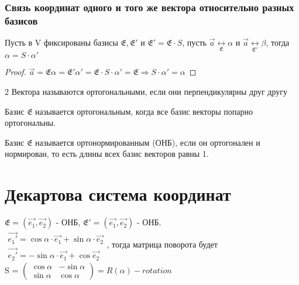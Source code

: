 \subsubsection{Связь координат одного и того же вектора относительно разных базисов}
\begin{proposition}
	Пусть в V фиксированы базисы $\mathfrak{E}, \mathfrak{E'}$ и \(\mathfrak{E'} = \mathfrak{E}\cdot S\), пусть $\vec{a}\underset{\mathfrak{E}}{\longleftrightarrow}\alpha$ и 
	$\vec{a}\underset{\mathfrak{E'}}{\longleftrightarrow}\beta$, тогда \(\alpha = S\cdot \alpha'\)
\end{proposition}
\begin{proof}
	$\vec{a} = \mathfrak{E}\alpha = \mathfrak{E'}\alpha' = \mathfrak{E}\cdot S\cdot \alpha' = \mathfrak{E} \Longrightarrow S\cdot \alpha' = \alpha$
\end{proof}
\begin{definition}
	2 Вектора называются ортогональными, если они перпендикулярны друг другу
\end{definition}
\begin{definition}
	Базис $\mathfrak{E}$ называется ортогональным, когда все базис векторы попарно ортогональны.
\end{definition}
\begin{definition}
	Базис $\mathfrak{E}$ называется ортонормированным (ОНБ), если он ортогонален и нормирован, то есть длины всех базис векторов равны 1.
\end{definition}
\section{Декартова система координат}

\(\mathfrak{E} = (\vec{e_1}, \vec{e_2})\) - ОНБ, \(\mathfrak{E'} = (\vec{e_1}, \vec{e_2})\) - ОНБ. \\
\(\begin{gathered}
	\vec{e_1'} = \cos\alpha\cdot\vec{e_1} + \sin\alpha\cdot\vec{e_2} \\
	\vec{e_2'} = -\sin\alpha\cdot\vec{e_1} + \cos \vec{e_2} 
\end{gathered}\), тогда матрица поворота будет \\ S = \(\begin{pmatrix}
\cos\alpha  & -\sin\alpha \\
\sin \alpha & \cos \alpha
\end{pmatrix} = R(\alpha) - rotation\)

